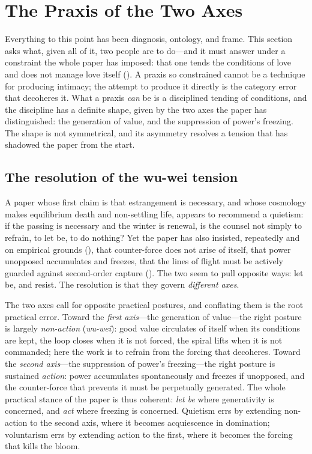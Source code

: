 \section{The Praxis of the Two Axes}
\label{p17:sec:praxis}

\noindent
Everything to this point has been diagnosis, ontology, and frame. This section asks what, given all of it, two people are to do---and it must answer under a constraint the whole paper has imposed: that one tends the conditions of love and does not manage love itself (). A praxis so constrained cannot be a technique for producing intimacy; the attempt to produce it directly is the category error that decoheres it. What a praxis \emph{can} be is a disciplined tending of conditions, and the discipline has a definite shape, given by the two axes the paper has distinguished: the generation of value, and the suppression of power's freezing. The shape is not symmetrical, and its asymmetry resolves a tension that has shadowed the paper from the start.

\subsection{The resolution of the wu-wei tension}
\label{p17:sub:praxis-wuwei}

A paper whose first claim is that estrangement is necessary, and whose cosmology makes equilibrium death and non-settling life, appears to recommend a quietism: if the passing is necessary and the winter is renewal, is the counsel not simply to refrain, to let be, to do nothing? Yet the paper has also insisted, repeatedly and on empirical grounds (), that counter-force does not arise of itself, that power unopposed accumulates and freezes, that the lines of flight must be actively guarded against second-order capture (). The two seem to pull opposite ways: let be, and resist. The resolution is that they govern \emph{different axes}.

\begin{claim}
The two axes call for opposite practical postures, and conflating them is the root practical error. Toward the \emph{first axis}---the generation of value---the right posture is largely \emph{non-action} (\emph{wu-wei}): good value circulates of itself when its conditions are kept, the loop closes when it is not forced, the spiral lifts when it is not commanded; here the work is to refrain from the forcing that decoheres. Toward the \emph{second axis}---the suppression of power's freezing---the right posture is sustained \emph{action}: power accumulates spontaneously and freezes if unopposed, and the counter-force that prevents it must be perpetually generated. The whole practical stance of the paper is thus coherent: \emph{let be} where generativity is concerned, and \emph{act} where freezing is concerned. Quietism errs by extending non-action to the second axis, where it becomes acquiescence in domination; voluntarism errs by extending action to the first, where it becomes the forcing that kills the bloom.
\end{claim}

